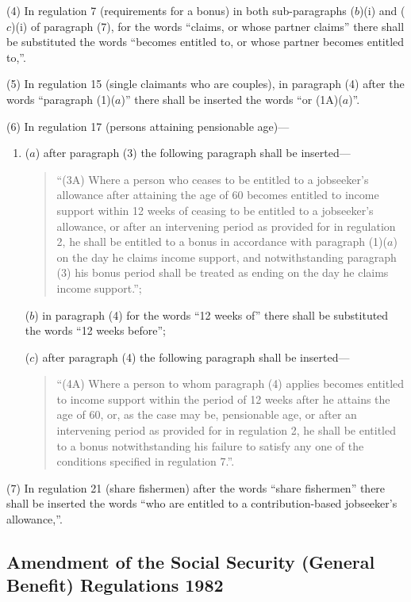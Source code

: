 \documentclass[a4paper]{article}
\begin{document}
(4) In regulation 7 (requirements for a bonus) in both sub-paragraphs ($b$)(i) and ($c$)(i) of paragraph (7), for the words “claims, or whose partner claims” there shall be substituted the words “becomes entitled to, or whose partner becomes entitled to,”.

(5) In regulation 15 (single claimants who are couples), in paragraph (4) after the words “paragraph (1)($a$)” there shall be inserted the words “or (1A)($a$)”.

(6) In regulation 17 (persons attaining pensionable age)—
\begin{enumerate}\item[]
($a$) after paragraph (3) the following paragraph shall be inserted—
\begin{quotation}
“(3A) Where a person who ceases to be entitled to a jobseeker’s allowance after attaining the age of 60 becomes entitled to income support within 12 weeks of ceasing to be entitled to a jobseeker’s allowance, or after an intervening period as provided for in regulation 2, he shall be entitled to a bonus in accordance with paragraph (1)($a$) on the day he claims income support, and notwithstanding paragraph (3) his bonus period shall be treated as ending on the day he claims income support.”;
\end{quotation}

($b$) in paragraph (4) for the words “12 weeks of” there shall be substituted the words “12 weeks before”;

($c$) after paragraph (4) the following paragraph shall be inserted—
\begin{quotation}
“(4A) Where a person to whom paragraph (4) applies becomes entitled to income support within the period of 12 weeks after he attains the age of 60, or, as the case may be, pensionable age, or after an intervening period as provided for in regulation 2, he shall be entitled to a bonus notwithstanding his failure to satisfy any one of the conditions specified in regulation 7.”.
\end{quotation}
\end{enumerate}

(7) In regulation 21 (share fishermen) after the words “share fishermen” there shall be inserted the words “who are entitled to a contribution-based jobseeker’s allowance,”.

\subsection[5. Amendment of the Social Security (General Benefit) Regulations 1982]{Amendment of the Social Security (General Benefit) Regulations 1982}
\end{document}
